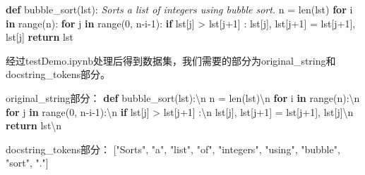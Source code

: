 \documentclass[
]{article}
\newenvironment{Shaded}{}{}
\newcommand{\BuiltInTok}[1]{\textcolor[rgb]{0.00,0.50,0.00}{#1}}
\newcommand{\CommentTok}[1]{\textcolor[rgb]{0.38,0.63,0.69}{\textit{#1}}}
\newcommand{\ControlFlowTok}[1]{\textcolor[rgb]{0.00,0.44,0.13}{\textbf{#1}}}
\newcommand{\DecValTok}[1]{\textcolor[rgb]{0.25,0.63,0.44}{#1}}
\newcommand{\KeywordTok}[1]{\textcolor[rgb]{0.00,0.44,0.13}{\textbf{#1}}}
\newcommand{\NormalTok}[1]{#1}
\newcommand{\OperatorTok}[1]{\textcolor[rgb]{0.40,0.40,0.40}{#1}}
\newcommand{\StringTok}[1]{\textcolor[rgb]{0.25,0.44,0.63}{#1}}
\begin{document}
\begin{Shaded}
  \begin{Highlighting}[]
    \KeywordTok{def}\NormalTok{ bubble\_sort(lst):}
    \CommentTok{\textquotesingle{}\textquotesingle{}\textquotesingle{}}
    \CommentTok{    Sorts a list of integers using bubble sort.}
    \CommentTok{    \textquotesingle{}\textquotesingle{}\textquotesingle{}}
    \NormalTok{    n }\OperatorTok{=} \BuiltInTok{len}\NormalTok{(lst)}
    \ControlFlowTok{for}\NormalTok{ i }\KeywordTok{in} \BuiltInTok{range}\NormalTok{(n):}
    \ControlFlowTok{for}\NormalTok{ j }\KeywordTok{in} \BuiltInTok{range}\NormalTok{(}\DecValTok{0}\NormalTok{, n}\OperatorTok{{-}}\NormalTok{i}\OperatorTok{{-}}\DecValTok{1}\NormalTok{):}
    \ControlFlowTok{if}\NormalTok{ lst[j] }\OperatorTok{\textgreater{}}\NormalTok{ lst[j}\OperatorTok{+}\DecValTok{1}\NormalTok{] :}
    \NormalTok{                lst[j], lst[j}\OperatorTok{+}\DecValTok{1}\NormalTok{] }\OperatorTok{=}\NormalTok{ lst[j}\OperatorTok{+}\DecValTok{1}\NormalTok{], lst[j]}
    \ControlFlowTok{return}\NormalTok{ lst}
  \end{Highlighting}
\end{Shaded}

经过testDemo.ipynb处理后得到数据集，我们需要的部分为original\_string和docstring\_tokens部分。

\begin{Shaded}
  \begin{Highlighting}[]
    \NormalTok{original\_string部分：}
    \KeywordTok{def}\NormalTok{ bubble\_sort(lst):\textbackslash{}n    n }\OperatorTok{=} \BuiltInTok{len}\NormalTok{(lst)\textbackslash{}n    }\ControlFlowTok{for}\NormalTok{ i }\KeywordTok{in} \BuiltInTok{range}\NormalTok{(n):\textbackslash{}n        }\ControlFlowTok{for}\NormalTok{ j }\KeywordTok{in} \BuiltInTok{range}\NormalTok{(}\DecValTok{0}\NormalTok{, n}\OperatorTok{{-}}\NormalTok{i}\OperatorTok{{-}}\DecValTok{1}\NormalTok{):\textbackslash{}n            }\ControlFlowTok{if}\NormalTok{ lst[j] }\OperatorTok{\textgreater{}}\NormalTok{ lst[j}\OperatorTok{+}\DecValTok{1}\NormalTok{] :\textbackslash{}n                lst[j], lst[j}\OperatorTok{+}\DecValTok{1}\NormalTok{] }\OperatorTok{=}\NormalTok{ lst[j}\OperatorTok{+}\DecValTok{1}\NormalTok{], lst[j]\textbackslash{}n    }\ControlFlowTok{return}\NormalTok{ lst\textbackslash{}n}

    \NormalTok{docstring\_tokens部分：}
    \NormalTok{[}\StringTok{"Sorts"}\NormalTok{, }\StringTok{"a"}\NormalTok{, }\StringTok{"list"}\NormalTok{, }\StringTok{"of"}\NormalTok{, }\StringTok{"integers"}\NormalTok{, }\StringTok{"using"}\NormalTok{, }\StringTok{"bubble"}\NormalTok{, }\StringTok{"sort"}\NormalTok{, }\StringTok{"."}\NormalTok{]}
  \end{Highlighting}
\end{Shaded}
\end{document}
